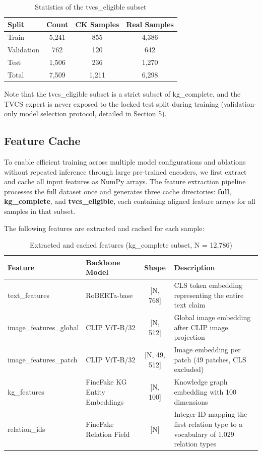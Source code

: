 \begin{table}[!htbp]
\centering
\caption{Statistics of the tvcs\_eligible subset}
\begin{tabularx}{\linewidth}{|X|c|c|c|}
\hline
\textbf{Split} & \textbf{Count} & \textbf{CK Samples} & \textbf{Real Samples} \\
\hline
Train & 5,241 & 855 & 4,386 \\
\hline
Validation & 762 & 120 & 642 \\
\hline
Test & 1,506 & 236 & 1,270 \\
\hline
Total & 7,509 & 1,211 & 6,298 \\
\hline
\end{tabularx}
\end{table}

Note that the tvcs\_eligible subset is a strict subset of kg\_complete, and the TVCS expert is never exposed to the locked test split during training (validation-only model selection protocol, detailed in Section 5).

\subsection{Feature Cache}
To enable efficient training across multiple model configurations and ablations without repeated inference through large pre-trained encoders, we first extract and cache all input features as NumPy arrays. The feature extraction pipeline processes the full dataset once and generates three cache directories: \textbf{full}, \textbf{kg\_complete}, and \textbf{tvcs\_eligible}, each containing aligned feature arrays for all samples in that subset.

The following features are extracted and cached for each sample:

\begin{table}[!t]
\centering
\caption{Extracted and cached features (kg\_complete subset, N = 12,786)}
\begin{tabularx}{\textwidth}{|X|X|c|X|}
\hline
\textbf{Feature} & \textbf{Backbone Model} & \textbf{Shape} & \textbf{Description} \\
\hline
text\_features & RoBERTa-base \cite{ref6} & [N, 768] & CLS token embedding representing the entire text claim \\
\hline
image\_features\_global & CLIP ViT-B/32 \cite{ref39} & [N, 512] & Global image embedding after CLIP image projection \\
\hline
image\_features\_patch & CLIP ViT-B/32 & [N, 49, 512] & Image embedding per patch (49 patches, CLS excluded) \\
\hline
kg\_features & FineFake KG Entity Embeddings & [N, 100] & Knowledge graph embedding with 100 dimensions \\
\hline
relation\_ids & FineFake Relation Field & [N] & Integer ID mapping the first relation type to a vocabulary of 1,029 relation types \\
\hline
\end{tabularx}
\end{table}

